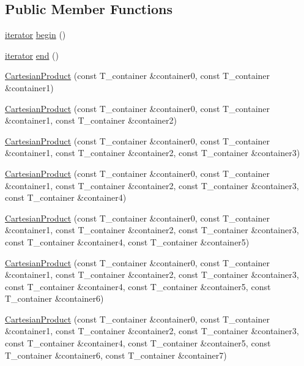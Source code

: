 \subsection*{Public Member Functions}
\begin{DoxyCompactItemize}
\item 
\hyperlink{classCartesianProduct_ad09a4b0d85a53d95634642e3cc3560ce}{iterator} \hyperlink{classCartesianProduct_a7818b04bbbdf663534135ad222077558}{begin} ()
\item 
\hyperlink{classCartesianProduct_ad09a4b0d85a53d95634642e3cc3560ce}{iterator} \hyperlink{classCartesianProduct_a809f865e4fc46ecbc8d06b47eb27a158}{end} ()
\item 
\hyperlink{classCartesianProduct_adf91f70aa920d3573729ec529c72a853}{Cartesian\+Product} (const T\+\_\+container \&container0, const T\+\_\+container \&container1)
\item 
\hyperlink{classCartesianProduct_ac85ec6ccf7510610a549ec2c3b785cab}{Cartesian\+Product} (const T\+\_\+container \&container0, const T\+\_\+container \&container1, const T\+\_\+container \&container2)
\item 
\hyperlink{classCartesianProduct_a05ed0d59b95c73d5d29a5bdcb674afc7}{Cartesian\+Product} (const T\+\_\+container \&container0, const T\+\_\+container \&container1, const T\+\_\+container \&container2, const T\+\_\+container \&container3)
\item 
\hyperlink{classCartesianProduct_ae23a3d355538e8f9c265b72faddc25e2}{Cartesian\+Product} (const T\+\_\+container \&container0, const T\+\_\+container \&container1, const T\+\_\+container \&container2, const T\+\_\+container \&container3, const T\+\_\+container \&container4)
\item 
\hyperlink{classCartesianProduct_a402c71cb6e766ed6154c3db20862a98d}{Cartesian\+Product} (const T\+\_\+container \&container0, const T\+\_\+container \&container1, const T\+\_\+container \&container2, const T\+\_\+container \&container3, const T\+\_\+container \&container4, const T\+\_\+container \&container5)
\item 
\hyperlink{classCartesianProduct_adefdedd596a0a17463ffa253a4d57f1b}{Cartesian\+Product} (const T\+\_\+container \&container0, const T\+\_\+container \&container1, const T\+\_\+container \&container2, const T\+\_\+container \&container3, const T\+\_\+container \&container4, const T\+\_\+container \&container5, const T\+\_\+container \&container6)
\item 
\hyperlink{classCartesianProduct_aa9961bdde8a8a898e44a01ef683df57f}{Cartesian\+Product} (const T\+\_\+container \&container0, const T\+\_\+container \&container1, const T\+\_\+container \&container2, const T\+\_\+container \&container3, const T\+\_\+container \&container4, const T\+\_\+container \&container5, const T\+\_\+container \&container6, const T\+\_\+container \&container7)

\end{DoxyCompactItemize}
